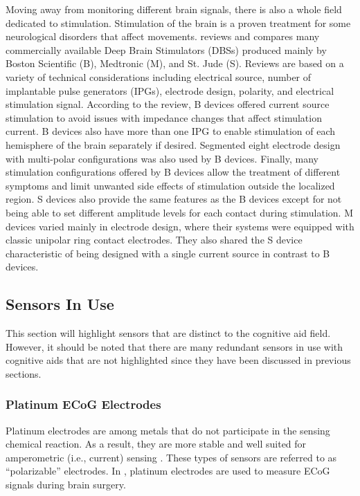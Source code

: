 Moving away from monitoring different brain signals, there is also a whole field dedicated to stimulation. Stimulation of the brain is a proven treatment for some neurological disorders that affect movements. \textcite{amon_systems_2017} reviews and compares many commercially available Deep Brain Stimulators (DBSs) produced mainly by Boston Scientific (B), Medtronic (M), and St. Jude (S). Reviews are based on a variety of technical considerations including electrical source, number of implantable pulse generators (IPGs), electrode design, polarity, and electrical stimulation signal. According to the review, B devices offered current source stimulation to avoid issues with impedance changes that affect stimulation current. B devices also have more than one IPG to enable stimulation of each hemisphere of the brain separately if desired. Segmented eight electrode design with multi-polar configurations was also used by B devices. Finally, many stimulation configurations offered by B devices allow the treatment of different symptoms and limit unwanted side effects of stimulation outside the localized region. S devices also provide the same features as the B devices except for not being able to set different amplitude levels for each contact during stimulation. M devices varied mainly in electrode design, where their systems were equipped with classic unipolar ring contact electrodes. They also shared the S device characteristic of being designed with a single current source in contrast to B devices.

\subsection{Sensors In Use}
This section will highlight sensors that are distinct to the cognitive aid field. However, it should be noted that there are many redundant sensors in use with cognitive aids that are not highlighted since they have been discussed in previous sections.

\subsubsection{Platinum ECoG Electrodes}
Platinum electrodes are among metals that do not participate in the sensing chemical reaction. As a result, they are more stable and well suited for amperometric (i.e., current) sensing \parencite{ida_sensors_2013}. These types of sensors are referred to as ``polarizable'' electrodes. In \textcite{yamakawa_implantable_2019}, platinum electrodes are used to measure ECoG signals during brain surgery.

